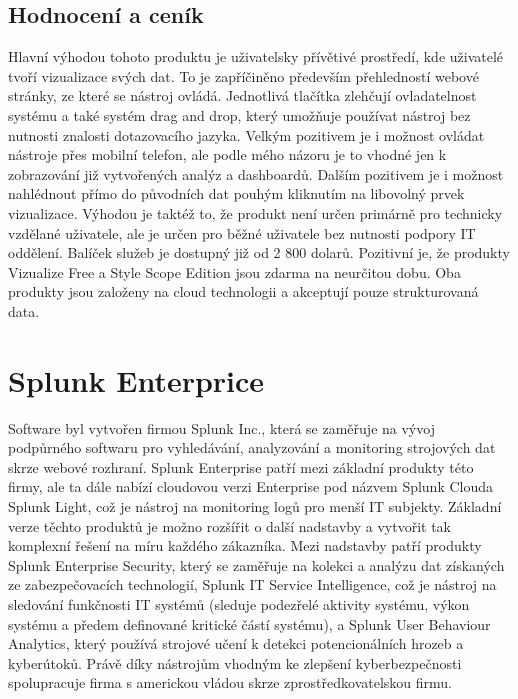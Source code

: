 \documentclass[czech,BP]{thesiskiv}
\begin{document}
\subsection{Hodnocení a ceník}
Hlavní výhodou tohoto produktu je uživatelsky přívětivé prostředí, kde uživatelé tvoří vizualizace svých dat. To je zapříčiněno především přehledností webové stránky, ze které se nástroj ovládá. Jednotlivá tlačítka zlehčují ovladatelnost systému a také systém drag and drop, který umožňuje používat nástroj bez nutnosti znalosti dotazovacího jazyka. Velkým pozitivem je i možnost ovládat nástroje přes mobilní telefon, ale podle mého názoru je to vhodné jen k zobrazování již vytvořených analýz a dashboardů. Dalším pozitivem je i možnost nahlédnout přímo do původních dat pouhým kliknutím na libovolný prvek vizualizace. Výhodou je taktéž to, že produkt není určen primárně pro technicky vzdělané uživatele, ale je určen pro běžné uživatele bez nutnosti podpory IT oddělení. Balíček služeb je dostupný již od 2 800 dolarů.\cite{InetCenik} Pozitivní je, že produkty Vizualize Free a Style Scope Edition jsou zdarma na neurčitou dobu. Oba produkty jsou založeny na cloud technologii a akceptují pouze strukturovaná data.


\section{Splunk Enterprice}
Software byl vytvořen firmou Splunk Inc., která se zaměřuje na vývoj podpůrného softwaru pro vyhledávání, analyzování a monitoring strojových dat skrze webové rozhraní.\cite{Splunk_a_kompatibilita} Splunk Enterprise patří mezi základní produkty této firmy, ale ta dále nabízí cloudovou verzi Enterprise pod názvem Splunk Cloud\texttrademark a Splunk Light, což je nástroj na monitoring logů pro menší IT subjekty. Základní verze těchto produktů je možno rozšířit o další nadstavby a vytvořit tak komplexní řešení na míru každého zákazníka. Mezi nadstavby patří produkty Splunk Enterprise Security, který se zaměřuje na kolekci a analýzu dat získaných ze zabezpečovacích technologií, Splunk IT Service Intelligence, což je nástroj na sledování funkčnosti IT systémů (sleduje podezřelé aktivity systému, výkon systému a předem definované kritické částí systému), a Splunk User Behaviour Analytics, který používá strojové učení k detekci potencionálních hrozeb a kyberútoků. Právě díky nástrojům vhodným ke zlepšení kyberbezpečnosti spolupracuje firma s americkou vládou skrze zprostředkovatelskou firmu.\cite{Splunk_security}
\end{document}
